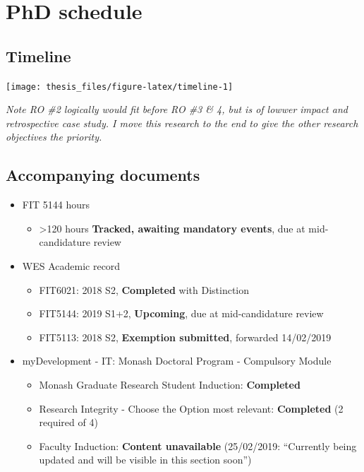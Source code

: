 \documentclass{monashthesis}
\begin{document}
\chapter*{PhD schedule}\label{phd-schedule}

\section{Timeline}\label{timeline}

\begin{center}\texttt{[image: thesis\_files/figure-latex/timeline-1]} \end{center}

\emph{Note RO \#2 logically would fit before RO \#3 \& 4, but is of
lowwer impact and retrospective case study. I move this research to the
end to give the other research objectives the priority.}

\section{Accompanying documents}\label{accompanying-documents}

\begin{itemize}
\tightlist
\item
  FIT 5144 hours

  \begin{itemize}
  \tightlist
  \item
    \textgreater{}120 hours \textbf{Tracked, awaiting mandatory events},
    due at mid-candidature review
  \end{itemize}
\item
  WES Academic record

  \begin{itemize}
  \tightlist
  \item
    FIT6021: 2018 S2, \textbf{Completed} with Distinction
  \item
    FIT5144: 2019 S1+2, \textbf{Upcoming}, due at mid-candidature review
  \item
    FIT5113: 2018 S2, \textbf{Exemption submitted}, forwarded 14/02/2019
  \end{itemize}
\item
  myDevelopment - IT: Monash Doctoral Program - Compulsory Module

  \begin{itemize}
  \tightlist
  \item
    Monash Graduate Research Student Induction: \textbf{Completed}
  \item
    Research Integrity - Choose the Option most relevant:
    \textbf{Completed} (2 required of 4)
  \item
    Faculty Induction: \textbf{Content unavailable} (25/02/2019:
    ``Currently being updated and will be visible in this section
    soon'')
  \end{itemize}
\end{itemize}
\end{document}
